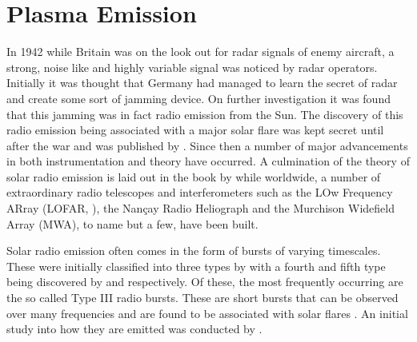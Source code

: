 
\chapter{Plasma Emission}
\label{app:plasma}
In 1942 while Britain was on the look out for radar signals of enemy aircraft, a strong, noise like and highly variable signal was noticed by radar operators. Initially it was thought that Germany had managed to learn the secret of radar and create some sort of jamming device. On further investigation it was found that this jamming was in fact radio emission from the Sun. The discovery of this radio emission being associated with a major solar flare was kept secret until after the war and was published by \cite{Appleton1946}.
Since then a number of major advancements in both instrumentation and theory have occurred. A culmination of the theory of solar radio emission is laid out in the book by \cite{McLean1985} while worldwide, a number of extraordinary radio telescopes and interferometers such as the LOw Frequency ARray (LOFAR, \citeauthor{VanHaarlem2013b} \citeyear{VanHaarlem2013b}), the Nan\c{c}ay Radio Heliograph and the Murchison Widefield Array (MWA), to name but a few, have been built.

Solar radio emission often comes in the form of bursts of varying timescales. These were initially classified into three types by \cite{Wild1950b} with a fourth and fifth type being discovered by \cite{Boischot1957} and \cite{Wild1959} respectively. Of these, the most frequently occurring are the so called Type III radio bursts. These are short bursts that can be observed over many frequencies and are found to be associated with solar flares \citep{Malville1962}. An initial study into how they are emitted was conducted by \cite{Ginzburg1958}.%

